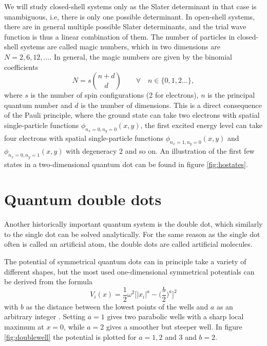 We will study closed-shell systems only as the Slater determinant in that case is unambiguous, i.e, there is only one possible determinant. In open-shell systems, there are in general multiple possible Slater determinants, and the trial wave function is thus a linear combination of them. The number of particles in closed-shell systems are called magic numbers, which in two dimensions are $N=2,6,12,\hdots$. In general, the magic numbers are given by the binomial coefficients
\begin{equation}
N=s\binom{n+d}{d} \quad\quad\forall\quad n\in\{0,1,2...\},
\label{eq:HOclosedshell}
\end{equation}
where $s$ is the number of spin configurations (2 for electrons), $n$ is the principal quantum number and $d$ is the number of dimensions. This is a direct consequence of the Pauli principle, where the ground state can take two electrons with spatial single-particle functions $\phi_{n_x=0,n_y=0}(x,y)$, the first excited energy level can take four electrons with spatial single-particle functions $\phi_{n_x=1,n_y=0}(x,y)$ and $\phi_{n_x=0,n_y=1}(x,y)$ with degeneracy 2 and so on. An illustration of the first few states in a two-dimensional quantum dot can be found in figure \eqref{fig:hostates}.


%

\section{Quantum double dots} \label{sec:doubledots}
Another historically important quantum system is the double dot, which similarly to the single dot can be solved analytically. For the same reason as the single dot often is called an artificial atom, the double dots are called artificial molecules. 

The potential of symmetrical quantum dots can in principle take a variety of different shapes, but the most used one-dimensional symmetrical potentials can be derived from the formula
\begin{equation}
V_i(x)=\frac{1}{2}\omega^2\bigg[|x_i|^a-\Big(\frac{b}{2}\Big)^a\bigg]^2
\label{eq:doublewell}
\end{equation}
with $b$ as the distance between the lowest points of the wells and $a$ as an arbitrary integer \cite{jelic_double_2012}. Setting $a=1$ gives two parabolic wells with a sharp local maximum at $x=0$, while $a=2$ gives a smoother but steeper well. In figure \eqref{fig:doublewell} the potential is plotted for $a=1,2$ and $3$ and $b=2$.

